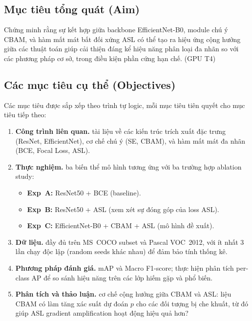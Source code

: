 \documentclass{article}
\begin{document}
\subsection*{Mục tiêu tổng quát (Aim)}

Chứng minh rằng sự kết hợp giữa backbone EfficientNet-B0, module
chú ý CBAM, và hàm mất mát bất đối xứng ASL có thể tạo ra hiệu ứng cộng hưởng giữa các thuật toán giúp cải thiện đáng kể hiệu năng phân loại đa nhãn so với các
phương pháp cơ sở, trong điều kiện phần cứng hạn chế. (GPU T4)

\subsection*{Các mục tiêu cụ thể (Objectives)}

Các mục tiêu được sắp xếp theo trình tự logic, mỗi mục tiêu tiên quyết cho mục tiêu
tiếp theo:

\begin{enumerate}[leftmargin=2em, label=\textbf{O\arabic*.}]
  \item \textbf{Công trình liên quan.} tài liệu về các kiến trúc trích xuất đặc trưng
        (ResNet, EfficientNet), cơ chế chú ý (SE, CBAM), và hàm mất mát đa nhãn
        (BCE, Focal Loss, ASL).

  \item \textbf{Thực nghiệm.} ba biến thể mô hình tương ứng với ba trường hợp ablation study:
        \begin{itemize}
          \item \textbf{Exp~A:} ResNet50 + BCE (baseline).
          \item \textbf{Exp~B:} ResNet50 + ASL (xem xét sự đóng góp của loss ASL).
          \item \textbf{Exp~C:} EfficientNet-B0 + CBAM + ASL (mô hình đề xuất).
        \end{itemize}

  \item \textbf{Dữ liệu.} đầy đủ trên MS~COCO subset và Pascal VOC~2012,
        với ít nhất 3 lần chạy độc lập (random seeds khác nhau) để đảm bảo tính
        thống kê.

  \item \textbf{Phương pháp đánh giá.} mAP và Macro F1-score; thực hiện phân tích
        per-class AP để so sánh hiệu năng trên các lớp hiếm gặp và phổ biến.

  \item \textbf{Phân tích và thảo luận.} cơ chế cộng hưởng giữa CBAM và ASL: liệu
        CBAM có làm tăng xác suất dự đoán $p$ cho các đối tượng bị che khuất, từ
        đó giúp ASL gradient amplification hoạt động hiệu quả hơn?
\end{enumerate}
\end{document}
